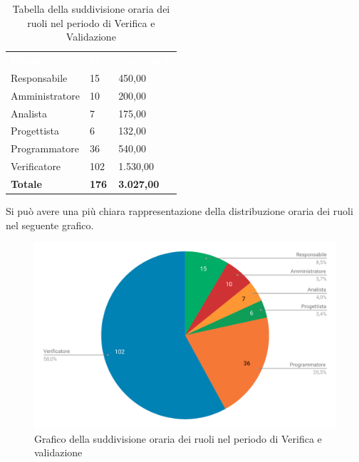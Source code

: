 \begin{table}[H]	
	\begin{center}
	    \begin{tabular}{C{4cm}C{1cm}C{3,5cm}}
			\textcolor{white}{\textbf{Ruolo}} & \textcolor{white}{\textbf{Ore}} & \textcolor{white}{\textbf{Costo in €}}
			\\
			Responsabile & 15 & 450,00 \\
			Amministratore & 10 & 200,00 \\
			Analista & 7 & 175,00 \\
			Progettista & 6 & 132,00 \\
			Programmatore & 36 & 540,00 \\
			Verificatore & 102 & 1.530,00 \\
			\textbf{Totale} & \textbf{176} & \textbf{3.027,00} \\
		\end{tabular}
	    \caption{Tabella della suddivisione oraria dei ruoli nel periodo di Verifica e Validazione} \label{tab:tabellaRuoliVerifica e validazione} 
	\end{center}
\end{table}


Si può avere una più chiara rappresentazione della distribuzione oraria dei ruoli nel seguente grafico.

\begin{figure}[H]
	\includegraphics[width=1\linewidth]{Preventivo/grafici/VV2_1.pdf}
	\caption{Grafico della suddivisione oraria dei ruoli nel periodo di Verifica e validazione}
\end{figure}

